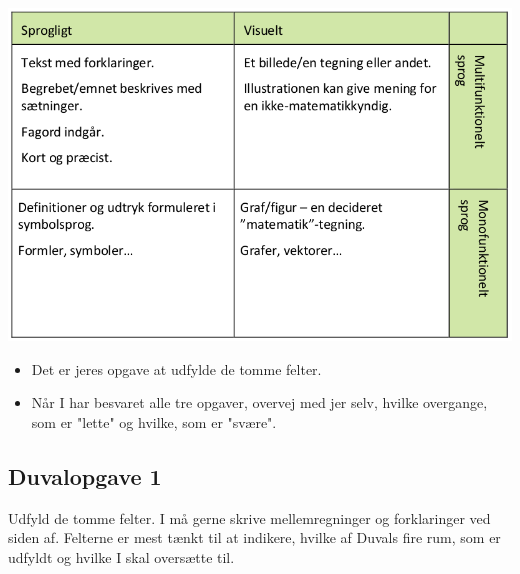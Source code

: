 \documentclass[a4paper, 12pt]{article}
\begin{document}
\begin{center}
\includegraphics[width=.9\linewidth]{img/duval.png}
\end{center}

\begin{itemize}
\item Det er jeres opgave at udfylde de tomme felter.

\item Når I har besvaret alle tre opgaver, overvej med jer selv, hvilke overgange, som er "lette" og hvilke, som er "svære".
\end{itemize}

\newpage

\subsection*{Duvalopgave 1}
\label{sec:org7295d30}

Udfyld de tomme felter. I må gerne skrive mellemregninger og forklaringer ved siden af. Felterne er mest tænkt til at indikere, hvilke af Duvals fire rum, som er udfyldt og hvilke I skal oversætte til.
\end{document}
